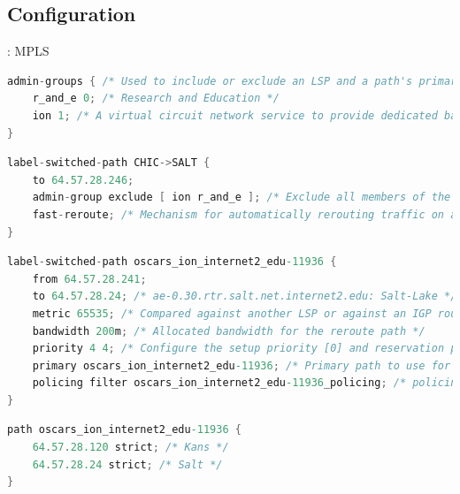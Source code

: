 \documentclass[usenames,dvipsnames]{beamer}
\begin{document}
\subsection{Configuration}
\begin{frame}[fragile]{\insertsubsection: MPLS}
\begin{lstlisting}[language=C]
admin-groups { /* Used to include or exclude an LSP and a path's primary and secondary paths */
    r_and_e 0; /* Research and Education */
    ion 1; /* A virtual circuit network service to provide dedicated bandwidth for the most demanding apps */
}
\end{lstlisting}
\vfill
\begin{lstlisting}[language=C]
label-switched-path CHIC->SALT {
    to 64.57.28.246;
    admin-group exclude [ ion r_and_e ]; /* Exclude all members of the group */
    fast-reroute; /* Mechanism for automatically rerouting traffic on an LSP if a node or link in an LSP fails */
}
\end{lstlisting}
\vfill
\begin{lstlisting}[language=C]
label-switched-path oscars_ion_internet2_edu-11936 {
    from 64.57.28.241;
    to 64.57.28.24; /* ae-0.30.rtr.salt.net.internet2.edu: Salt-Lake */
    metric 65535; /* Compared against another LSP or against an IGP route instead of using a dynamic and automatically tracks underlying IGP metrics. */
    bandwidth 200m; /* Allocated bandwidth for the reroute path */
    priority 4 4; /* Configure the setup priority [0] and reservation priority [1] */
    primary oscars_ion_internet2_edu-11936; /* Primary path to use for an LSP */
    policing filter oscars_ion_internet2_edu-11936_policing; /* policing filter */
}
\end{lstlisting}
\vfill
\begin{lstlisting}[language=C]
path oscars_ion_internet2_edu-11936 {
    64.57.28.120 strict; /* Kans */
    64.57.28.24 strict; /* Salt */
}
\end{lstlisting}

\end{frame}
\end{document}
